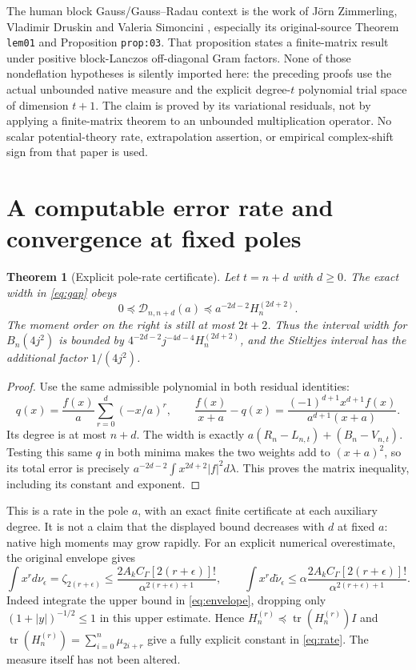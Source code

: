 \documentclass[11pt]{article}
\newtheorem{theorem}{Theorem}
\newcommand{\tr}{\operatorname{tr}}
\begin{document}
The human block Gauss/Gauss--Radau context is the work of J\"orn
Zimmerling, Vladimir Druskin and Valeria Simoncini \cite{ZDS},
especially its original-source Theorem \texttt{lem01} and Proposition
\texttt{prop:03}.  That proposition states a finite-matrix result
under positive block-Lanczos off-diagonal Gram factors.  None of those
nondeflation hypotheses is silently imported here: the preceding
proofs use the actual unbounded native measure and the explicit
degree-$t$ polynomial trial space of dimension $t+1$.  The claim is
proved by its variational residuals, not by applying a finite-matrix
theorem to an unbounded multiplication operator.  No scalar
potential-theory rate, extrapolation assertion, or empirical
complex-shift sign from that paper is used.

\section{A computable error rate and convergence at fixed poles}

\begin{theorem}[Explicit pole-rate certificate]\label{thm:rate}
Let $t=n+d$ with $d\ge0$.  The exact width in \eqref{eq:gap} obeys
\begin{equation}\label{eq:rate}
 \boxed{0\preceq\mathcal D_{n,n+d}(a)
 \preceq a^{-2d-2}H_n^{(2d+2)}.}
\end{equation}
The moment order on the right is still at most $2t+2$.
Thus the interval width for $B_n(4j^2)$ is bounded by
$4^{-2d-2}j^{-4d-4}H_n^{(2d+2)}$, and the Stieltjes interval has
the additional factor $1/(4j^2)$.
\end{theorem}
\begin{proof}
Use the same admissible polynomial in both residual identities:
\[
 q(x)=\frac{f(x)}a\sum_{r=0}^d(-x/a)^r,
 \qquad\frac{f(x)}{x+a}-q(x)
 =\frac{(-1)^{d+1}x^{d+1}f(x)}{a^{d+1}(x+a)}.
\]
Its degree is at most $n+d$.  The width is exactly
$a(R_n-L_{n,t})+(B_n-V_{n,t})$.  Testing this same $q$ in both
minima makes the two weights add to $(x+a)^2$, so its total error
is precisely
$a^{-2d-2}\int x^{2d+2}|f|^2d\lambda$.  This proves the matrix
inequality, including its constant and exponent.
\end{proof}

This is a rate in the pole $a$, with an exact finite certificate at
each auxiliary degree.  It is not a claim that the displayed bound
decreases with $d$ at fixed $a$: native high moments may grow rapidly.
For an explicit numerical overestimate, the original envelope gives
\begin{equation}\label{eq:momentcap}
 \int x^r d\nu_\epsilon
 =\zeta_{2(r+\epsilon)}
 \le\frac{2A_kC_\Gamma[2(r+\epsilon)]!}
 {\alpha^{2(r+\epsilon)+1}},\qquad
 \int x^r d\widetilde\nu_\epsilon
 \le\alpha\frac{2A_kC_\Gamma[2(r+\epsilon)]!}
 {\alpha^{2(r+\epsilon)+1}}.
\end{equation}
Indeed integrate the upper bound in \eqref{eq:envelope}, dropping
only $(1+|y|)^{-1/2}\le1$ in this upper estimate.  Hence
$H_n^{(r)}\preceq\tr(H_n^{(r)})I$ and
$\tr(H_n^{(r)})=\sum_{i=0}^n\mu_{2i+r}$ give a fully explicit
constant in \eqref{eq:rate}.  The measure itself has not been altered.
\end{document}
